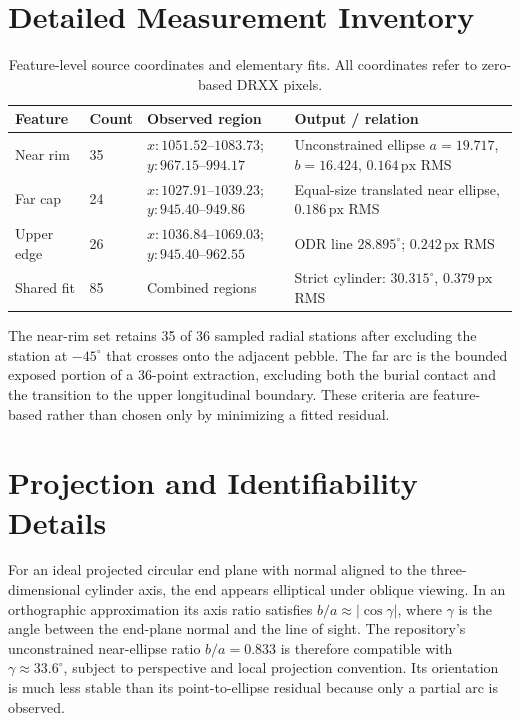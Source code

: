 \documentclass[11pt,letterpaper]{article}
\newcommand{\px}{\,\mathrm{px}}
\begin{document}
\appendix
\section{Detailed Measurement Inventory}
\label{app:inventory}

\begin{table}[ht]
\centering\small
\caption{Feature-level source coordinates and elementary fits. All coordinates refer to zero-based DRXX pixels.}
\begin{tabularx}{\linewidth}{@{}l l l X@{}}
\toprule
\textbf{Feature} & \textbf{Count} & \textbf{Observed region} & \textbf{Output / relation} \\
\midrule
Near rim & 35 & \(x:1051.52\)--\(1083.73\); \(y:967.15\)--\(994.17\) & Unconstrained ellipse \(a=19.717\), \(b=16.424\), \(0.164\px\) RMS \\
Far cap & 24 & \(x:1027.91\)--\(1039.23\); \(y:945.40\)--\(949.86\) & Equal-size translated near ellipse, \(0.186\px\) RMS \\
Upper edge & 26 & \(x:1036.84\)--\(1069.03\); \(y:945.40\)--\(962.55\) & ODR line \(28.895^\circ\); \(0.242\px\) RMS \\
Shared fit & 85 & Combined regions & Strict cylinder: \(30.315^\circ\), \(0.379\px\) RMS \\
\bottomrule
\end{tabularx}
\end{table}

The near-rim set retains 35 of 36 sampled radial stations after excluding the station at \(-45^\circ\) that crosses onto the adjacent pebble. The far arc is the bounded exposed portion of a 36-point extraction, excluding both the burial contact and the transition to the upper longitudinal boundary. These criteria are feature-based rather than chosen only by minimizing a fitted residual.

\section{Projection and Identifiability Details}
\label{app:projection}

For an ideal projected circular end plane with normal aligned to the three-dimensional cylinder axis, the end appears elliptical under oblique viewing. In an orthographic approximation its axis ratio satisfies \(b/a\approx|\cos\gamma|\), where \(\gamma\) is the angle between the end-plane normal and the line of sight. The repository's unconstrained near-ellipse ratio \(b/a=0.833\) is therefore compatible with \(\gamma\approx33.6^\circ\), subject to perspective and local projection convention. Its orientation is much less stable than its point-to-ellipse residual because only a partial arc is observed.
\end{document}
